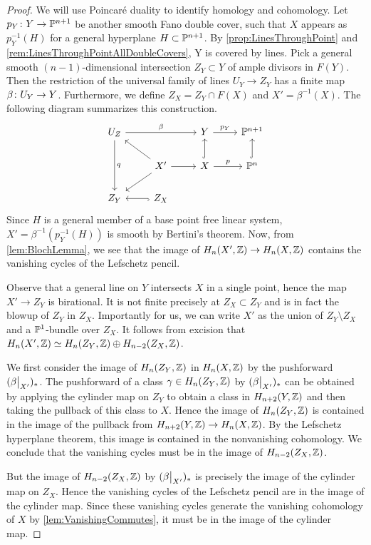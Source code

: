 \begin{proof}
We will use Poincar\'e duality to identify homology and cohomology.  Let $p_Y \from Y \to \P^{n+1}$ be another smooth Fano double cover, such that $X$ appears as $p_Y^{-1}(H)$ for a general hyperplane $H \subset \P^{n+1}$. By \cref{prop:LinesThroughPoint} and \cref{rem:LinesThroughPointAllDoubleCovers}, Y is covered by lines. Pick a general smooth $(n-1)$-dimensional intersection $Z_Y \subset Y$ of ample divisors in $F(Y)$. Then the restriction of the universal family of lines $U_Y \to Z_Y$ has a finite map $\beta \from U_Y \to Y$. Furthermore, we define $Z_X = Z_Y \cap F(X)$ and $X' = \beta^{-1}(X)$. The following diagram summarizes this construction.
\begin{equation*}
  \begin{tikzcd}
    U_Z \arrow["q"]{dd} \arrow["\beta"]{rr} &   & Y \arrow["p_Y"]{r}& \P^{n+1}\\
      & X' \arrow{r} \arrow{ul} \arrow{dl}& X \arrow[hook]{u} \arrow["p"]{r}& \P^n \arrow[hook]{u}\\
    Z_Y  & Z_X \arrow[hook]{l}& 
  \end{tikzcd}
\end{equation*}
 Since $H$ is a general member of a base point free linear system, $X' = \beta^{-1}(p_Y^{-1}(H))$ is smooth by Bertini's theorem. Now, from \cref{lem:BlochLemma}, we see that the image of $H_n(X',\Z) \to H_n(X,\Z)$ contains the vanishing cycles of the Lefschetz pencil.
 
 Observe that a general line on $Y$ intersects $X$ in a single point, hence the map $X' \to Z_Y$ is birational. It is not finite precisely at $Z_X \subset Z_Y$ and is in fact the blowup of $Z_Y$ in $Z_X$. Importantly for us, we can write $X'$ as the union of $Z_Y \setminus Z_X$ and a $\P^1$-bundle over $Z_X$. It follows from excision that $H_n(X',\Z) \simeq H_n(Z_Y,\Z) \oplus H_{n-2}(Z_X,\Z)$.
 
We first consider the image of $H_n(Z_Y,\Z)$ in $H_n(X,\Z)$ by the pushforward $(\restr{\beta}{X'})_*$. The pushforward of a class $\gamma \in H_n(Z_Y,\Z)$ by $(\restr{\beta}{X'})_*$ can be obtained by applying the cylinder map on $Z_Y$ to obtain a class in $H_{n+2}(Y,\Z)$ and then taking the pullback of this class to $X$. Hence the image of $H_n(Z_Y,\Z)$  is contained in the image of the pullback from $H_{n+2}(Y,\Z) \to H_n(X,\Z)$. By the Lefschetz hyperplane theorem, this image is contained in the nonvanishing cohomology. We conclude that the vanishing cycles must be in the image of $H_{n-2}(Z_X,\Z)$.

But the image of $H_{n-2}(Z_X,\Z)$ by $(\restr{\beta}{X'})_*$ is precisely the image of the cylinder map on $Z_X$. Hence the vanishing cycles of the Lefschetz pencil are in the image of the cylinder map. Since these vanishing cycles generate the vanishing cohomology of $X$ by \cref{lem:VanishingCommutes}, it must be in the image of the cylinder map.
\end{proof}


